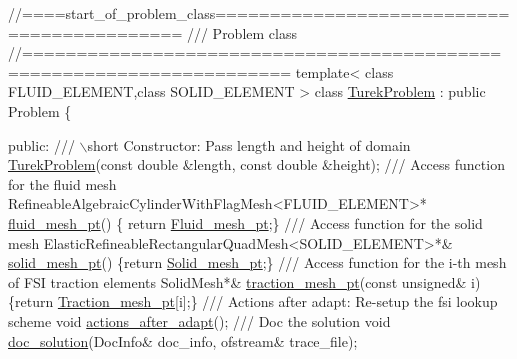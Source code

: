  
\begin{DoxyCodeInclude}
\textcolor{comment}{//====start\_of\_problem\_class=========================================== }
\textcolor{comment}{/// Problem class}
\textcolor{comment}{}\textcolor{comment}{//====================================================================== }
\textcolor{keyword}{template}< \textcolor{keyword}{class} FLUID\_ELEMENT,\textcolor{keyword}{class} SOLID\_ELEMENT >
\textcolor{keyword}{class }\hyperlink{classTurekProblem}{TurekProblem} : \textcolor{keyword}{public} Problem
\{

\textcolor{keyword}{public}:
\textcolor{comment}{}
\textcolor{comment}{ /// \(\backslash\)short Constructor: Pass length and height of domain}
\textcolor{comment}{} \hyperlink{classTurekProblem_a69f6624fd854393f0c0e5303603ec749}{TurekProblem}(\textcolor{keyword}{const} \textcolor{keywordtype}{double} &length, \textcolor{keyword}{const} \textcolor{keywordtype}{double} &height);
 \textcolor{comment}{}
\textcolor{comment}{ /// Access function for the fluid mesh }
\textcolor{comment}{} RefineableAlgebraicCylinderWithFlagMesh<FLUID\_ELEMENT>* \hyperlink{classTurekProblem_a0fc23b86efec256cb7f4450a928f7999}{fluid\_mesh\_pt}() 
  \{ \textcolor{keywordflow}{return} \hyperlink{classTurekProblem_a18a0daace5dc50db4b93879e4a600e6a}{Fluid\_mesh\_pt};\}
\textcolor{comment}{}
\textcolor{comment}{ /// Access function for the solid mesh}
\textcolor{comment}{} ElasticRefineableRectangularQuadMesh<SOLID\_ELEMENT>*& \hyperlink{classTurekProblem_a89430ae6d87a85a83e23e14e0b0d72b7}{solid\_mesh\_pt}() 
  \{\textcolor{keywordflow}{return} \hyperlink{classTurekProblem_a1a449088ae3cc96ade1c58979294afed}{Solid\_mesh\_pt};\} 
\textcolor{comment}{}
\textcolor{comment}{ /// Access function for the i-th mesh of FSI traction elements}
\textcolor{comment}{} SolidMesh*& \hyperlink{classTurekProblem_a93a4b3d4e598a499631e00cfa701ee3c}{traction\_mesh\_pt}(\textcolor{keyword}{const} \textcolor{keywordtype}{unsigned}& i)
  \{\textcolor{keywordflow}{return} \hyperlink{classTurekProblem_a0b8588d0f133ffb9a281c5747786f95f}{Traction\_mesh\_pt}[i];\} 
 \textcolor{comment}{}
\textcolor{comment}{ /// Actions after adapt: Re-setup the fsi lookup scheme}
\textcolor{comment}{} \textcolor{keywordtype}{void} \hyperlink{classTurekProblem_a39df0332d7606a5befe89bb0e581184b}{actions\_after\_adapt}();
\textcolor{comment}{}
\textcolor{comment}{ /// Doc the solution}
\textcolor{comment}{} \textcolor{keywordtype}{void} \hyperlink{classTurekProblem_a2cf0eb1610b4c3a7cdbd3c7948cdd46e}{doc\_solution}(DocInfo& doc\_info, ofstream& trace\_file);

\end{DoxyCodeInclude}
